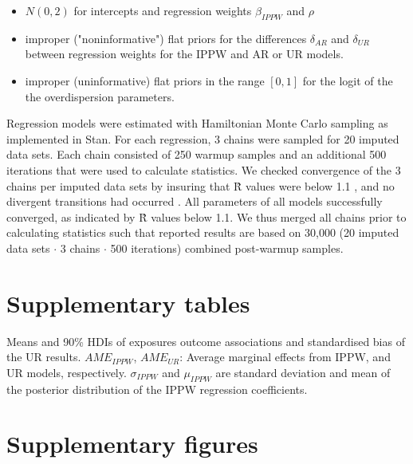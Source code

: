 \documentclass[12pt]{article}
\begin{document}
\begin{itemize}
	\item $N(0,2)$ for intercepts and regression weights $\beta_{IPPW}$ and $\rho$
	\item improper ("noninformative") flat priors for the differences $\delta_{AR}$ and $\delta_{UR}$ between regression weights for the IPPW and AR or UR models.
	\item improper (uninformative) flat priors in the range $[0,1]$ for the logit of the the overdispersion parameters.
\end{itemize}


Regression models were estimated with Hamiltonian Monte Carlo sampling as implemented in Stan. For each regression, 3 chains were sampled for 20 imputed data sets. Each chain consisted of 250 warmup samples and an additional 500 iterations that were used to calculate statistics. We checked convergence of the 3 chains per imputed data sets by insuring that \^{R} values were below 1.1 \cite{Gelman1992-jz}, and no divergent transitions had occurred \cite{Stan_Development_Team2016-pc}. All parameters of all models successfully converged, as indicated by \^{R} values below 1.1. We thus merged all chains prior to calculating statistics \cite{Zhou2010-li} such that reported results are based on 30,000 (20 imputed data sets $\cdot$ 3 chains $\cdot$ 500 iterations) combined post-warmup samples.

\newpage

\section{Supplementary tables}





\begin{sidewaystable}
	
	\caption{Means and 90\% HDIs of exposures outcome associations and standardised bias of the UR results.
		$AME_{IPPW}$, $AME_{UR}$: Average marginal effects from IPPW, and UR models, respectively. $\sigma_{IPPW}$ and $\mu_{IPPW}$ are standard deviation and mean of the posterior distribution of the IPPW regression coefficients. } 
	\label{table:estimates-UR}
\end{sidewaystable}
\newpage

\section{Supplementary figures}
\end{document}
